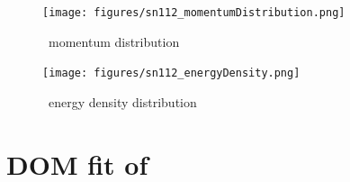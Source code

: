 \begin{figure}[H]
    \centering
    \texttt{[image: figures/sn112\_momentumDistribution.png]}
    \caption{\snTwelve\ momentum distribution}
    \label{DOMFitData_sn112_momentumDistribution}
\end{figure}

\begin{figure}[H]
    \centering
    \texttt{[image: figures/sn112\_energyDensity.png]}
    \caption{\snTwelve\ energy density distribution}
    \label{DOMFitData_sn112_energyDensity}
\end{figure}

\section{DOM fit of \snFour}

